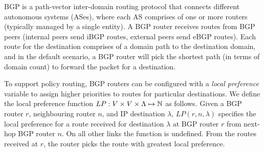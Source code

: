BGP is a path-vector inter-domain 
routing protocol that connects 
different autonomous systems (ASes), where each AS
comprises of one or more routers (typically managed
by a single entity). A BGP router receives routes 
from BGP peers (internal peers send iBGP routes, 
external peers send eBGP routes). Each route 
for the destination comprises of a domain path
 to the destination domain, and in the default
 scenario, a BGP router will pick the shortest
 path (in terms of domain count) to forward
 the packet for a destination. 
 
To support policy routing, BGP routers can be 
configured with a \emph{local preference} variable
to assign higher priorities to routes for particular
destinations. We define the local preference function 
$LP: V \times V \times \Lambda \mapsto \mathbb{N}$ as follows.
Given a BGP router $r$, neighbouring router $n$,
and IP destination $\lambda$,
  $LP(r, n, \lambda)$ 
specifies the local preference for a route received 
for destination $\lambda$ at BGP router $r$ 
from next-hop BGP router $n$. 
On all other links the function is undefined. From 
the routes received at $r$, the router
picks the route with greatest local preference. 

